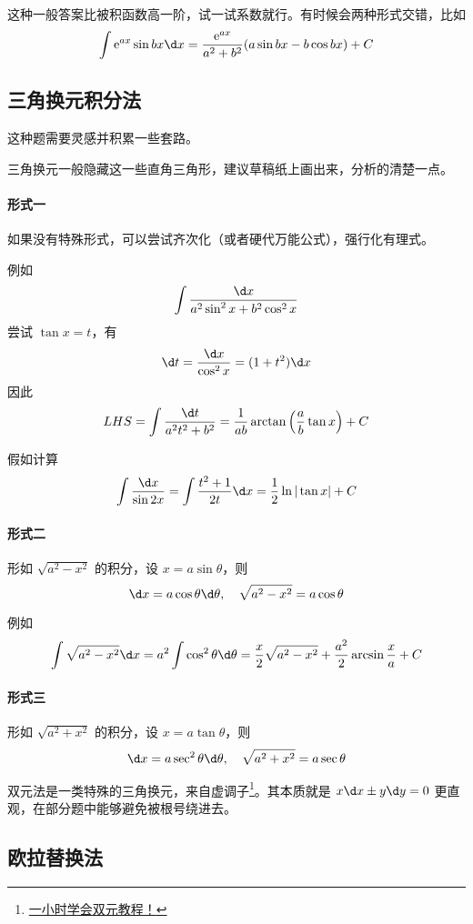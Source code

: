 这种一般答案比被积函数高一阶，试一试系数就行。有时候会两种形式交错，比如
\[ \int \ee^{ax} \sin bx \d x = \frac{\ee^{ax}}{a^2+b^2} (a \sin bx - b \cos bx) + C\]


\subsection{三角换元积分法}

这种题需要灵感并积累一些套路。

三角换元一般隐藏这一些直角三角形，建议草稿纸上画出来，分析的清楚一点。

\paragraph{形式一} 如果没有特殊形式，可以尝试齐次化（或者硬代万能公式），强行化有理式。

例如
\[ \int \frac{\d x}{a^2 \sin^2 x + b^2 \cos^2 x} \]
尝试 $\tan x = t$，有
\[ \d t = \frac{\d x}{\cos^2 x} = (1 + t^2) \d x \]
因此
\[ LHS = \int \frac{\d t}{a^2 t^2 + b^2} = \frac{1}{ab} \arctan \left( \frac{a}{b} \tan x \right) + C \]


假如计算
\[ \int \frac{\d x}{\sin 2x} = \int \frac{t^2+1}{2t} \d x = \frac{1}{2} \ln | \tan x| + C \]


\paragraph{形式二} 形如 $\sqrt{a^2 - x^2}$ 的积分，设 $x = a \sin \theta$，则
\[ \d x = a \cos \theta \d \theta, \quad \sqrt{a^2 - x^2} = a \cos \theta \]

例如
\[ \int \sqrt{a^2 - x^2} \d x = a^2 \int \cos^2 \theta \d \theta = \frac{x}{2}\sqrt{a^2 - x^2} + \frac{a^2}{2} \arcsin \frac{x}{a} + C \]

\paragraph{形式三} 形如 $\sqrt{a^2 + x^2}$ 的积分，设 $x = a \tan \theta$，则
\[ \d x = a \sec^2 \theta \d \theta, \quad \sqrt{a^2+x^2} = a \sec \theta \]

双元法是一类特殊的三角换元，来自虚调子\footnote{\href{https://zhuanlan.zhihu.com/p/443599480}{一小时学会双元教程！}}。其本质就是 $x\d x \pm y \d y = 0$ 更直观，在部分题中能够避免被根号绕进去。

\subsection{欧拉替换法}

